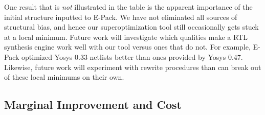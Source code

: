 One result that is \textit{not} illustrated in the table is the apparent
importance of the initial structure inputted to E-Pack. We have not eliminated
all sources of structural bias, and hence our superoptimization tool still
occasionally gets stuck at a local minimum. Future work will investigate which
qualities make a RTL synthesis engine work well with our tool versus ones that
do not. For example, E-Pack optimized Yosys 0.33 netlists better than ones
provided by Yosys 0.47. Likewise, future work will experiment with rewrite
procedures than can break out of these local minimums on their own.

\subsection{Marginal Improvement and Cost}\label{sec:results:margin}
